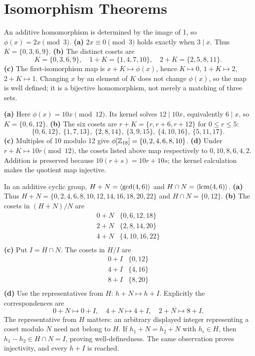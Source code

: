 \section{Isomorphism Theorems}

\idea An additive homomorphism is determined by the image of 1, so $\phi(x)=2x\pmod3$.
\textbf{(a)} $2x\equiv0\pmod3$ holds exactly when $3\mid x$. Thus
$K=\{0,3,6,9\}$.
\textbf{(b)} The distinct cosets are
\[
K=\{0,3,6,9\},\quad1+K=\{1,4,7,10\},\quad2+K=\{2,5,8,11\}.
\]
\textbf{(c)} The first-isomorphism map is $x+K\mapsto\phi(x)$, hence
$K\mapsto0$, $1+K\mapsto2$, $2+K\mapsto1$.
Changing $x$ by an element of $K$ does not change $\phi(x)$, so the map is well defined; it is a bijective homomorphism, not merely a matching of three sets.

\textbf{(a)} Here $\phi(x)=10x\pmod{12}$. Its kernel solves
$12\mid10x$, equivalently $6\mid x$, so $K=\{0,6,12\}$.
\textbf{(b)} The six cosets are $r+K=\{r,r+6,r+12\}$ for $0\le r\le5$:
\[
\{0,6,12\},\ \{1,7,13\},\ \{2,8,14\},\
\{3,9,15\},\ \{4,10,16\},\ \{5,11,17\}.
\]
\textbf{(c)} Multiples of 10 modulo 12 give $\phi[\mathbb{Z}_{18}]=\{0,2,4,6,8,10\}$.
\textbf{(d)} Under $r+K\mapsto10r\pmod{12}$, the cosets listed above map respectively to
$0,10,8,6,4,2$. Addition is preserved because $10(r+s)=10r+10s$; the kernel calculation makes the quotient map injective.

\idea In an additive cyclic group, $H+N=\langle \gcd(4,6)\rangle$ and $H\cap N=\langle \operatorname{lcm}(4,6)\rangle$.
\textbf{(a)} Thus $H+N=\{0,2,4,6,8,10,12,14,16,18,20,22\}$ and
$H\cap N=\{0,12\}$.
\textbf{(b)} The cosets in $(H+N)/N$ are
\[\begin{array}{c|l}
0+N & \{0,6,12,18\}\\
2+N & \{2,8,14,20\}\\
4+N & \{4,10,16,22\}\\\end{array}\]\textbf{(c)} Put $I=H\cap N$. The cosets in $H/I$ are\[\begin{array}{c|l}
0+I & \{0,12\}\\
4+I & \{4,16\}\\
8+I & \{8,20\}\\\end{array}\]\textbf{(d)} Use the representatives from $H$: $h+N\mapsto h+I$.
Explicitly the correspondences are
\[
0+N\longmapsto 0+I,\quad 4+N\longmapsto 4+I,\quad 2+N\longmapsto 8+I.
\]
The representative from $H$ matters: an arbitrary displayed integer representing a coset modulo $N$ need not belong to $H$.
If $h_1+N=h_2+N$ with $h_i\in H$, then $h_1-h_2\in H\cap N=I$, proving well-definedness. The same observation proves injectivity, and every $h+I$ is reached.

